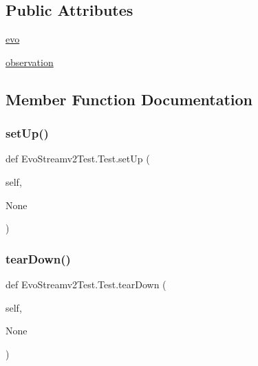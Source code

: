 \subsection*{Public Attributes}
\begin{DoxyCompactItemize}
\item 
\hyperlink{classEvoStreamv2Test_1_1Test_a7779f03f65692cfba7f175aa37217172}{evo}
\item 
\hyperlink{classEvoStreamv2Test_1_1Test_a4538c742103feb7803bd7f244ee8af05}{observation}
\end{DoxyCompactItemize}


\subsection{Member Function Documentation}
\mbox{\label{classEvoStreamv2Test_1_1Test_a9c0b339c66c2208af3f7979b42e8c9b2}} 
\subsubsection{\texorpdfstring{set\+Up()}{setUp()}}
{\footnotesize\ttfamily def Evo\+Streamv2\+Test.\+Test.\+set\+Up (\begin{DoxyParamCaption}\item[{}]{self,  }\item[{}]{None }\end{DoxyParamCaption})}

\mbox{\label{classEvoStreamv2Test_1_1Test_acd9a0d03c63adb779ced285660d28d47}} 
\subsubsection{\texorpdfstring{tear\+Down()}{tearDown()}}
{\footnotesize\ttfamily def Evo\+Streamv2\+Test.\+Test.\+tear\+Down (\begin{DoxyParamCaption}\item[{}]{self,  }\item[{}]{None }\end{DoxyParamCaption})}

